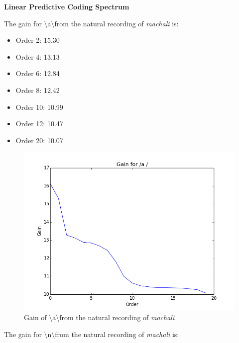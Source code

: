 \documentclass[a4paper]{article}
\begin{document}
\newpage

\textbf{Linear Predictive Coding Spectrum}


The gain for \textbackslash a\textbackslash from the natural recording of \textit{machali} is: 
\begin{itemize}
\item Order 2: 15.30 
\item Order 4: 13.13
\item Order 6: 12.84
\item Order 8: 12.42
\item Order 10: 10.99
\item Order 12: 10.47
\item Order 20: 10.07
\end{itemize}    

\begin{figure}[h!]
    \includegraphics[width=\linewidth]{./images/gain_a.png}
    \caption{Gain of \textbackslash a\textbackslash from the natural recording of \textit{machali}}
    \label{fig:1}
\end{figure}

 
 

 
 

The gain for \textbackslash n\textbackslash from the natural recording of \textit{machali} is: 
\end{document}
